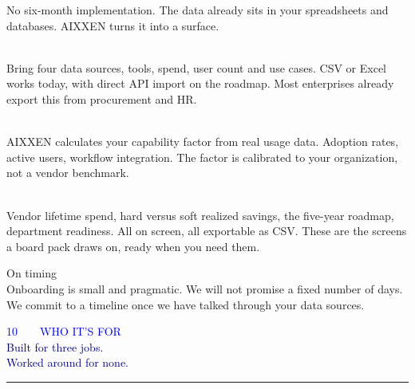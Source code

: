 \documentclass[10pt]{article}
\newcommand{\bodysize}{\fontsize{9.6}{15.2}\selectfont}
\newcommand{\sectionhead}[3]{%
  {\semibold\fontsize{8}{8}\selectfont\textcolor{blue}{#1\ \ \textbullet\ \ \MakeUppercase{#2}}}\\[5pt]
  {\black\fontsize{25}{28}\selectfont\textcolor{navy}{#3}}\\[6pt]
  {\color{blue}\rule{40pt}{2.8pt}}\par\vspace{14pt}}
\newcommand{\lead}[1]{{\medium\fontsize{11.5}{16}\selectfont\textcolor{slate}{#1}\par}}
\begin{document}
\lead{No six-month implementation. The data already sits in your spreadsheets and databases. AIXXEN turns it into a surface.}
\vspace{20pt}

\newcommand{\bigstep}[3]{%
\begin{minipage}[t]{\textwidth}
\begin{minipage}[t]{0.13\textwidth}
\vspace{-3pt}{\black\fontsize{38}{38}\selectfont\textcolor{paleblue}{#1}}
\end{minipage}\hfill
\begin{minipage}[t]{0.85\textwidth}
\vspace{2pt}{\heavy\fontsize{13}{15}\selectfont\textcolor{navy}{#2}}\\[4pt]
{\bodysize\textcolor{ink}{#3}}
\end{minipage}
\end{minipage}}

\bigstep{01}{Setup}{Bring four data sources, tools, spend, user count and use cases. CSV or Excel works today, with direct API import on the roadmap. Most enterprises already export this from procurement and HR.}
\vspace{14pt}{\color{linegray}\rule{\textwidth}{0.7pt}}\vspace{14pt}

\bigstep{02}{First capability snapshot}{AIXXEN calculates your capability factor from real usage data. Adoption rates, active users, workflow integration. The factor is calibrated to your organization, not a vendor benchmark.}
\vspace{14pt}{\color{linegray}\rule{\textwidth}{0.7pt}}\vspace{14pt}

\bigstep{03}{Reporting}{Vendor lifetime spend, hard versus soft realized savings, the five-year roadmap, department readiness. All on screen, all exportable as CSV. These are the screens a board pack draws on, ready when you need them.}

\vspace{22pt}
\begin{navyblock}
{\heavy\fontsize{11}{14}\selectfont On timing}\\[3pt]
{\bodysize\textcolor{linegray}{Onboarding is small and pragmatic. We will not promise a fixed number of days. We commit to a timeline once we have talked through your data sources.}}
\end{navyblock}
\newpage

\sectionhead{10}{Who It's For}{Built for three jobs.\\Worked around for none.}
\end{document}
